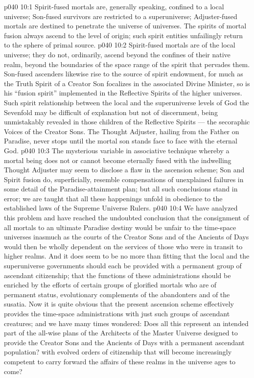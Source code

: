\vs p040 10:1 Spirit\hyp{}fused mortals are, generally speaking, confined to a local universe; Son\hyp{}fused survivors are restricted to a superuniverse; Adjuster\hyp{}fused mortals are destined to penetrate the universe of universes. The spirits of mortal fusion always ascend to the level of origin; such spirit entities unfailingly return to the sphere of primal source.
\vs p040 10:2 Spirit\hyp{}fused mortals are of the local universe; they do not, ordinarily, ascend beyond the confines of their native realm, beyond the boundaries of the space range of the spirit that pervades them. Son\hyp{}fused ascenders likewise rise to the source of spirit endowment, for much as the Truth Spirit of a Creator Son focalizes in the associated Divine Minister, so is his “fusion spirit” implemented in the Reflective Spirits of the higher universes. Such spirit relationship between the local and the superuniverse levels of God the Sevenfold may be difficult of explanation but not of discernment, being unmistakably revealed in those children of the Reflective Spirits --- the secoraphic Voices of the Creator Sons. The Thought Adjuster, hailing from the Father on Paradise, never stops until the mortal son stands face to face with the eternal God.
\vs p040 10:3 \pc The mysterious variable in associative technique whereby a mortal being does not or cannot become eternally fused with the indwelling Thought Adjuster may seem to disclose a flaw in the ascension scheme; Son and Spirit fusion do, superficially, resemble compensations of unexplained failures in some detail of the Paradise\hyp{}attainment plan; but all such conclusions stand in error; we are taught that all these happenings unfold in obedience to the established laws of the Supreme Universe Rulers.
\vs p040 10:4 We have analyzed this problem and have reached the undoubted conclusion that the consignment of all mortals to an ultimate Paradise destiny would be unfair to the time\hyp{}space universes inasmuch as the courts of the Creator Sons and of the Ancients of Days would then be wholly dependent on the services of those who were in transit to higher realms. And it does seem to be no more than fitting that the local and the superuniverse governments should each be provided with a permanent group of ascendant citizenship; that the functions of these administrations should be enriched by the efforts of certain groups of glorified mortals who are of permanent status, evolutionary complements of the abandonters and of the susatia. Now it is quite obvious that the present ascension scheme effectively provides the time\hyp{}space administrations with just such groups of ascendant creatures; and we have many times wondered: Does all this represent an intended part of the all\hyp{}wise plans of the Architects of the Master Universe designed to provide the Creator Sons and the Ancients of Days with a permanent ascendant population? with evolved orders of citizenship that will become increasingly competent to carry forward the affairs of these realms in the universe ages to come?
